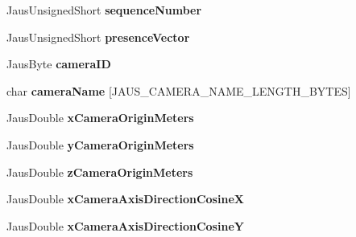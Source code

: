 \begin{DoxyCompactItemize}
\item 
\hypertarget{struct_report_camera_pose_message_struct_a7d0bf3eea27178940f52706d9acde172}{\-Jaus\-Unsigned\-Short {\bfseries sequence\-Number}}\label{struct_report_camera_pose_message_struct_a7d0bf3eea27178940f52706d9acde172}

\item 
\hypertarget{struct_report_camera_pose_message_struct_af00a0e57258e058fe511ca8f4946b0b8}{\-Jaus\-Unsigned\-Short {\bfseries presence\-Vector}}\label{struct_report_camera_pose_message_struct_af00a0e57258e058fe511ca8f4946b0b8}

\item 
\hypertarget{struct_report_camera_pose_message_struct_acc7acf6e5528bfdb13fba5291a4cb798}{\-Jaus\-Byte {\bfseries camera\-I\-D}}\label{struct_report_camera_pose_message_struct_acc7acf6e5528bfdb13fba5291a4cb798}

\item 
\hypertarget{struct_report_camera_pose_message_struct_a73f05315412b4ce53c04451447917798}{char {\bfseries camera\-Name} \mbox{[}\-J\-A\-U\-S\-\_\-\-C\-A\-M\-E\-R\-A\-\_\-\-N\-A\-M\-E\-\_\-\-L\-E\-N\-G\-T\-H\-\_\-\-B\-Y\-T\-E\-S\mbox{]}}\label{struct_report_camera_pose_message_struct_a73f05315412b4ce53c04451447917798}

\item 
\hypertarget{struct_report_camera_pose_message_struct_af9e7fded62f09707c11dcfec730517da}{\-Jaus\-Double {\bfseries x\-Camera\-Origin\-Meters}}\label{struct_report_camera_pose_message_struct_af9e7fded62f09707c11dcfec730517da}

\item 
\hypertarget{struct_report_camera_pose_message_struct_aba49bfd1d19f7b8d72b8b4157153d97f}{\-Jaus\-Double {\bfseries y\-Camera\-Origin\-Meters}}\label{struct_report_camera_pose_message_struct_aba49bfd1d19f7b8d72b8b4157153d97f}

\item 
\hypertarget{struct_report_camera_pose_message_struct_a0ca5c92311b7158236fa305f1a7eeedd}{\-Jaus\-Double {\bfseries z\-Camera\-Origin\-Meters}}\label{struct_report_camera_pose_message_struct_a0ca5c92311b7158236fa305f1a7eeedd}

\item 
\hypertarget{struct_report_camera_pose_message_struct_a0040ff6d112bd3694e75556e86c420d5}{\-Jaus\-Double {\bfseries x\-Camera\-Axis\-Direction\-Cosine\-X}}\label{struct_report_camera_pose_message_struct_a0040ff6d112bd3694e75556e86c420d5}

\item 
\hypertarget{struct_report_camera_pose_message_struct_a0b1fce3795c871c39adeedd6eced577d}{\-Jaus\-Double {\bfseries x\-Camera\-Axis\-Direction\-Cosine\-Y}}\label{struct_report_camera_pose_message_struct_a0b1fce3795c871c39adeedd6eced577d}


\end{DoxyCompactItemize}
